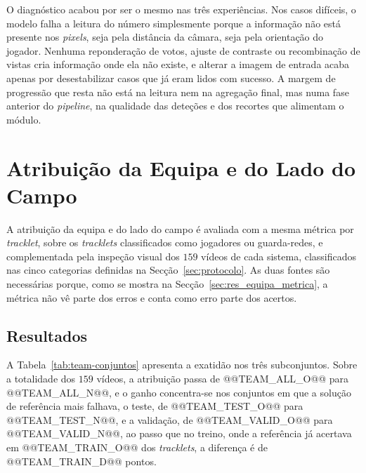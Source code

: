 O diagnóstico acabou por ser o mesmo nas três experiências. Nos casos difíceis, o modelo falha a
leitura do número simplesmente porque a informação não está presente nos \emph{pixels}, seja pela
distância da câmara, seja pela orientação do jogador. Nenhuma reponderação de votos, ajuste de
contraste ou recombinação de vistas cria informação onde ela não existe, e alterar a imagem de
entrada acaba apenas por desestabilizar casos que já eram lidos com sucesso. A margem de progressão
que resta não está na leitura nem na agregação final, mas numa fase anterior do \emph{pipeline}, na
qualidade das deteções e dos recortes que alimentam o módulo.

\section{Atribuição da Equipa e do Lado do Campo}\label{sec:res_equipa}

A atribuição da equipa e do lado do campo é avaliada com a mesma métrica por \emph{tracklet},
sobre os \emph{tracklets} classificados como jogadores ou guarda-redes, e complementada pela inspeção
visual dos $159$ vídeos de cada sistema, classificados nas cinco categorias definidas na
Secção~\ref{sec:protocolo}. As duas fontes são necessárias porque, como se mostra na
Secção~\ref{sec:res_equipa_metrica}, a métrica não vê parte dos erros e conta como erro parte dos
acertos.

\subsection{Resultados}\label{sec:res_equipa_resultados}

A Tabela~\ref{tab:team-conjuntos} apresenta a exatidão nos três subconjuntos. Sobre a totalidade
dos $159$ vídeos, a atribuição passa de @@TEAM_ALL_O@@ para @@TEAM_ALL_N@@, e o ganho concentra-se
nos conjuntos em que a solução de referência mais falhava, o teste, de @@TEAM_TEST_O@@ para
@@TEAM_TEST_N@@, e a validação, de @@TEAM_VALID_O@@ para @@TEAM_VALID_N@@, ao passo que no treino,
onde a referência já acertava em @@TEAM_TRAIN_O@@ dos \emph{tracklets}, a diferença é de
@@TEAM_TRAIN_D@@ pontos.

